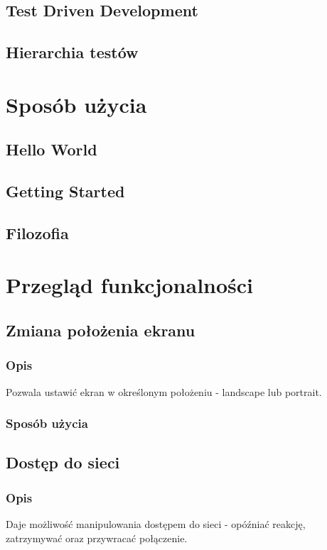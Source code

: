 \documentclass[a4paper]{article}
\begin{document}
\subsection{Test Driven Development}

\subsection{Hierarchia testów}

\section{Sposób użycia}
\subsection{Hello World}

\subsection{Getting Started}

\subsection{Filozofia}

\section{Przegląd funkcjonalności}
\subsection{Zmiana położenia ekranu}

\subsubsection{Opis}
Pozwala ustawić ekran w określonym położeniu - landscape lub portrait.

\subsubsection{Sposób użycia}

\subsection{Dostęp do sieci}

\subsubsection{Opis}
Daje możliwość manipulowania dostępem do sieci - opóźniać reakcję, zatrzymywać oraz przywracać połączenie.
\end{document}
